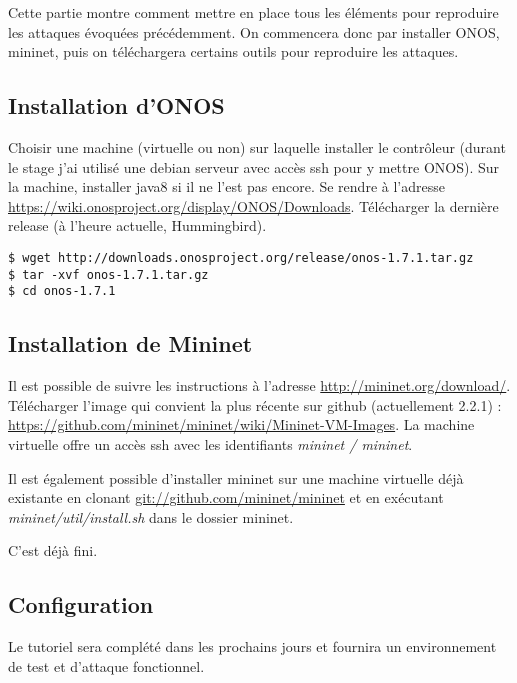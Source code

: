 Cette partie montre comment mettre en place tous les éléments pour reproduire les attaques évoquées précédemment. On commencera donc par installer ONOS, mininet, puis on téléchargera certains outils pour reproduire les attaques.

\subsection{Installation d'ONOS}

Choisir une machine (virtuelle ou non) sur laquelle installer le contrôleur (durant le stage j'ai utilisé une debian serveur avec accès ssh pour y mettre ONOS). Sur la machine, installer java8 si il ne l'est pas encore. Se rendre à l'adresse \url{https://wiki.onosproject.org/display/ONOS/Downloads}. Télécharger la dernière release (à l'heure actuelle, Hummingbird).

\begin{verbatim}
$ wget http://downloads.onosproject.org/release/onos-1.7.1.tar.gz
$ tar -xvf onos-1.7.1.tar.gz
$ cd onos-1.7.1
\end{verbatim}

\subsection{Installation de Mininet}

Il est possible de suivre les instructions à l'adresse \url{http://mininet.org/download/}. Télécharger l'image qui convient la plus récente sur github (actuellement 2.2.1) : \url{https://github.com/mininet/mininet/wiki/Mininet-VM-Images}. La machine virtuelle offre un accès ssh avec les identifiants \textit{mininet / mininet}.

Il est également possible d'installer mininet sur une machine virtuelle déjà existante en clonant \url{git://github.com/mininet/mininet} et en exécutant \textit{mininet/util/install.sh} dans le dossier mininet.

C'est déjà fini.


\subsection{Configuration}

Le tutoriel sera complété dans les prochains jours et fournira un environnement de test et d'attaque fonctionnel.
